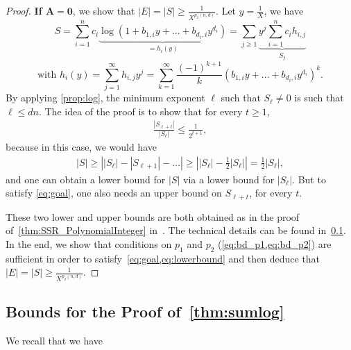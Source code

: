 \documentclass[a4paper, 11pt,dvipsnames]{article}
\newcommand\abs[1]{\left|#1\right|}
\begin{document}
\begin{proof}
\textbf{If $\mathbf{A = 0}$}, we show that $\left| E \right| = \left| S \right|   \ge  \frac{1}{X^{p_2(n,d)}} $. Let
                  $y = \frac{1}{X}$, we have \begin{equation*} S = \sum_{i=1}^n c_i \underbrace{\log \left( 1+ b_{1,i} y + \dots + b_{d_i,i} y^{d_i} \right)
                    }_{= h_i(y)} = \sum_{j \ge 1 } \underbrace{y^j \sum_{i=1}^n c_i h_{i,j}}_{S_j} \end{equation*} \begin{equation*} \text{with }h_i(y) =
                    \sum_{j=1}^\infty h_{i,j}y^j = \sum_{k=1}^\infty  \frac{(-1)^{k+1}}{k} \left( b_{1,i} y + \dots + b_{d_i,i} y^{d_i} \right)^k.
                  \end{equation*}
By applying \cref{prop:log}, the minimum exponent $\ell$ such that $S_\ell \neq 0$ is such that $\ell \le dn$. The idea of the proof is to show that
                  for every $t \ge 1$, \begin{align} \frac{\abs{S_{\ell+t}}}{\abs{S_\ell}} \le \frac{1}{2^{t+1}}, \label{eq:goal} \end{align}
because in this case, we would have \begin{align} \abs{S} \ge \abs{\abs{S_\ell}  - \abs{S_{\ell+1}} - \dots}
                  \ge \abs{\abs{S_\ell}- \frac{1}{2} \abs{S_\ell}} = \frac{1}{2} \abs{S_\ell}, \label{eq:lowerbound} \end{align} and
                  one can obtain a lower bound  for $\abs{S}$ via a lower bound for $\abs{S_\ell}$. But to satisfy \cref{eq:goal}, one also needs an upper bound on $S_{\ell+t}$, for every $t$.

                  These two lower and upper bounds are both obtained as in the proof of~\cref{thm:SSR_PolynomialInteger} in~\cite{kayal2012sum}. The technical
                  details can be found in~\cref{app:log_proof}. In the end, we show that conditions on $p_1$ and $p_2$ (\cref{eq:bd_p1,eq:bd_p2}) are sufficient in order to satisfy~\cref{eq:goal,eq:lowerbound} and then deduce that $\left|E \right| = \left| S\right| \ge \frac{1}{X^{p_2(n,d)}}$.

                  \end{proof}

                  \subsection{Bounds for the Proof of~\cref{thm:sumlog}} \label{app:log_proof} We recall that we have
\end{document}
